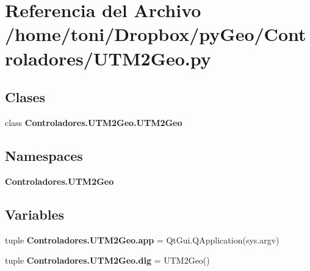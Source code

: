 \section{Referencia del Archivo /home/toni/\-Dropbox/py\-Geo/\-Controladores/\-U\-T\-M2\-Geo.py}
\label{Controladores_2UTM2Geo_8py}
\subsection*{Clases}
\begin{DoxyCompactItemize}
\item 
class {\bf Controladores.\-U\-T\-M2\-Geo.\-U\-T\-M2\-Geo}
\end{DoxyCompactItemize}
\subsection*{Namespaces}
\begin{DoxyCompactItemize}
\item 
{\bf Controladores.\-U\-T\-M2\-Geo}
\end{DoxyCompactItemize}
\subsection*{Variables}
\begin{DoxyCompactItemize}
\item 
tuple {\bf Controladores.\-U\-T\-M2\-Geo.\-app} = Qt\-Gui.\-Q\-Application(sys.\-argv)
\item 
tuple {\bf Controladores.\-U\-T\-M2\-Geo.\-dlg} = U\-T\-M2\-Geo()
\end{DoxyCompactItemize}
